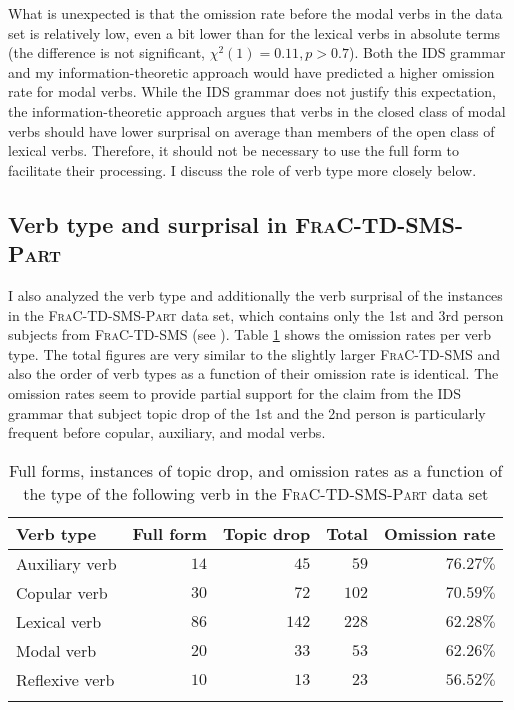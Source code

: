 What is unexpected is that the omission rate before the modal verbs in the data set is relatively low, even a bit lower than for the lexical verbs in absolute terms (the difference is not significant, $\chi^2 (1) = 0.11, p > 0.7$).
Both the IDS grammar and my information-theoretic approach would have predicted a higher omission rate for modal verbs.
While the IDS grammar does not justify this expectation, the information-theoretic approach argues that verbs in the closed class of modal verbs should have lower surprisal on average than members of the open class of lexical verbs.
Therefore, it should not be necessary to use the full form to facilitate their processing. 
I discuss the role of verb type more closely below.

\subsection{Verb type and surprisal in \textsc{FraC-TD-SMS-Part}}\label{sec:corpus.surprisal}
I also analyzed the verb type and additionally the verb surprisal of the instances in the \textsc{FraC-TD-SMS-Part} data set, which contains only the 1st and 3rd person subjects from \textsc{FraC-TD-SMS}  (see ).
Table \ref{tab:frac.verb.type.part.total} shows the omission rates per verb type.
The total figures are very similar to the slightly larger \textsc{FraC-TD-SMS} and also the order of verb types as a function of their omission rate is identical.
The omission rates seem to provide partial support for the claim from the IDS grammar \citep[415]{zifonun.etal1997} that subject topic drop of the 1st and the 2nd person is particularly frequent before copular, auxiliary, and modal verbs.

\begin{table}
\centering
\caption{Full forms, instances of topic drop, and omission rates as a function of the type of the following verb in the \textsc{FraC-TD-SMS-Part} data set}
\begin{tabular}{lrrrr}
\lsptoprule
Verb type & Full form & Topic drop & Total & Omission rate \\
\midrule
Auxiliary verb &  $14$ & $45$ & $59$ & $76.27\%$ \\
Copular verb & $30$ & $72$ & $102$ & $70.59\%$ \\
Lexical verb& $86$ & $142$ & $228$ & $62.28\%$\\
Modal verb & $20$ & $33$ & $53$ & $62.26\%$\\
Reflexive verb& $10$ & $13$ & $23$ & $56.52\%$ \\
\lspbottomrule
\end{tabular}
\label{tab:frac.verb.type.part.total}
\end{table}

